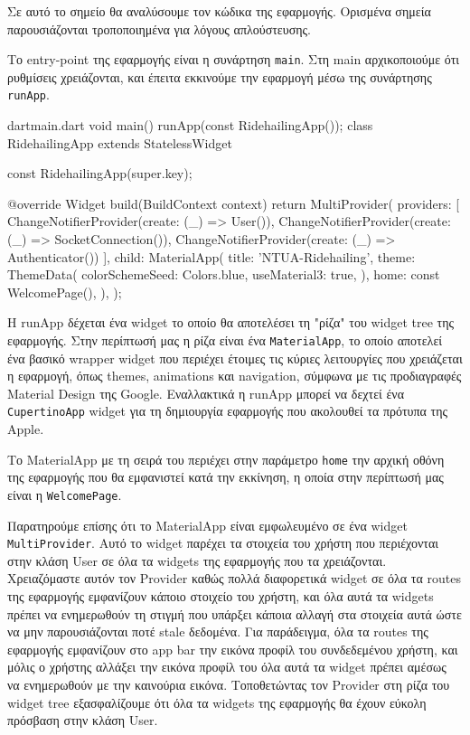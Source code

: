 \documentclass[../thesis.tex]{subfiles}
\begin{document}
Σε αυτό το σημείο θα αναλύσουμε τον κώδικα της εφαρμογής.
Ορισμένα σημεία παρουσιάζονται τροποποιημένα για λόγους απλούστευσης.

Το entry-point της εφαρμογής είναι η συνάρτηση \verb|main|.
Στη main αρχικοποιούμε ότι ρυθμίσεις χρειάζονται, και έπειτα εκκινούμε την εφαρμογή μέσω της συνάρτησης \verb|runApp|.

\begin{codeblock}{dart}{main.dart}
  void main() {
    runApp(const RidehailingApp());
  }
  class RidehailingApp extends StatelessWidget {
    const RidehailingApp({super.key});

    @override
    Widget build(BuildContext context) {
      return MultiProvider(
        providers: [
          ChangeNotifierProvider(create: (_) => User()),
          ChangeNotifierProvider(create: (_) => SocketConnection()),
          ChangeNotifierProvider(create: (_) => Authenticator())
        ],
        child: MaterialApp(
          title: 'NTUA-Ridehailing',
          theme: ThemeData(
            colorSchemeSeed: Colors.blue,
            useMaterial3: true,
          ),
          home: const WelcomePage(),
        ),
      );
    }
  }
\end{codeblock}

Η runApp δέχεται ένα widget το οποίο θα αποτελέσει τη "ρίζα" του widget tree της εφαρμογής.
Στην περίπτωσή μας η ρίζα είναι ένα \verb|MaterialApp|, το οποίο αποτελεί ένα βασικό wrapper widget που περιέχει έτοιμες τις κύριες λειτουργίες που χρειάζεται η εφαρμογή, όπως themes, animations και navigation, σύμφωνα με τις προδιαγραφές  Material Design της Google.
Εναλλακτικά η runApp μπορεί να δεχτεί ένα \verb|CupertinoApp| widget για τη δημιουργία εφαρμογής που ακολουθεί τα πρότυπα της Apple.

Το MaterialApp με τη σειρά του περιέχει στην παράμετρο \verb|home| την αρχική οθόνη της εφαρμογής που θα εμφανιστεί κατά την εκκίνηση, η οποία στην περίπτωσή μας είναι η \verb|WelcomePage|.

Παρατηρούμε επίσης ότι το MaterialApp είναι εμφωλευμένο σε ένα widget \verb|MultiProvider|.
Αυτό το widget παρέχει τα στοιχεία του χρήστη που περιέχονται στην κλάση User σε όλα τα widgets της εφαρμογής που τα χρειάζονται.
Χρειαζόμαστε αυτόν τον Provider καθώς πολλά διαφορετικά widget σε όλα τα routes της εφαρμογής εμφανίζουν κάποιο στοιχείο του χρήστη, και όλα αυτά τα widgets πρέπει να ενημερωθούν τη στιγμή που υπάρξει κάποια αλλαγή στα στοιχεία αυτά ώστε να μην παρουσιάζονται ποτέ stale δεδομένα.
Για παράδειγμα, όλα τα routes της εφαρμογής εμφανίζουν στο app bar την εικόνα προφίλ του συνδεδεμένου χρήστη, και μόλις ο χρήστης αλλάξει την εικόνα προφίλ του όλα αυτά τα widget πρέπει αμέσως να ενημερωθούν με την καινούρια εικόνα.
Τοποθετώντας τον Provider στη ρίζα του widget tree εξασφαλίζουμε ότι όλα τα widgets της εφαρμογής θα έχουν εύκολη πρόσβαση στην κλάση User.
\end{document}

